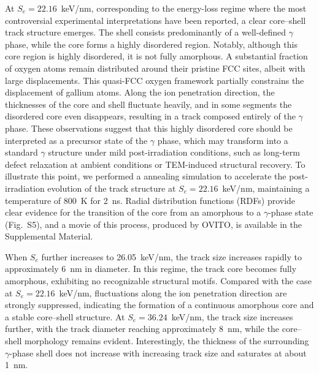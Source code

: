 \documentclass[aip,graphicx,amsmath,amssymb]{revtex4-1}
\begin{document}
At $S_e = 22.16$~keV/nm, corresponding to the energy-loss regime where the most
controversial experimental interpretations have been reported, a clear core--shell
track structure emerges.
The shell consists predominantly of a well-defined $\gamma$ phase, while the core
forms a highly disordered region.
Notably, although this core region is highly disordered, it is not fully amorphous.
A substantial fraction of oxygen atoms remain distributed around their pristine
FCC sites, albeit with large displacements.
This quasi-FCC oxygen framework partially constrains the displacement of gallium atoms.
Along the ion penetration direction, the thicknesses of the core and shell
fluctuate heavily, and in some segments the disordered core even disappears, resulting in
a track composed entirely of the $\gamma$ phase.
These observations suggest that this highly disordered core should be interpreted
as a precursor state of the $\gamma$ phase, which may transform into a standard 
$\gamma$ structure under mild post-irradiation conditions, such as
long-term defect relaxation at ambient conditions or TEM-induced structural recovery.
To illustrate this point, we performed a annealing simulation to accelerate the post-irradiation evolution 
of the track structure at $S_e = 22.16$~keV/nm, maintaining a temperature of 800~K for 2~ns. 
Radial distribution functions (RDFs) provide clear evidence for the transition of the core from an amorphous 
to a $\gamma$-phase state (Fig.~S5), and a movie of this process, produced by OVITO\cite{stukowskiVisualizationAnalysisAtomistic2010}, 
is available in the Supplemental Material.

When $S_e$ further increases to 26.05~keV/nm, the track size increases rapidly to 
approximately 6~nm in diameter.
In this regime, the track core becomes fully amorphous, exhibiting no recognizable
structural motifs.
Compared with the case at $S_e = 22.16$~keV/nm, fluctuations along the ion penetration
direction are strongly suppressed, indicating the formation of a continuous amorphous
core and a stable core--shell structure.
At $S_e = 36.24$~keV/nm, the track size increases further, with the track diameter
reaching approximately 8~nm, while the core--shell morphology remains evident.
Interestingly, the thickness of the surrounding $\gamma$-phase shell does not
increase with increasing track size and saturates at about 1~nm.
\end{document}
